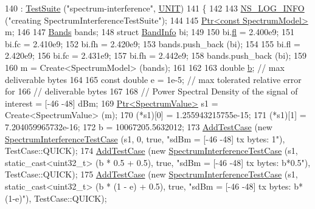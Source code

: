\begin{DoxyCode}
140   : \hyperlink{classns3_1_1TestSuite_a904b0c40583b744d30908aeb94636d1a}{TestSuite} (\textcolor{stringliteral}{"spectrum-interference"}, \hyperlink{classns3_1_1TestSuite_a1ebfcab34ec8161e085e8e3a1855eae0a3885375a3787abf60431f8454b3cadbd}{UNIT})
141 \{
142 
143   \hyperlink{group__logging_gafbd73ee2cf9f26b319f49086d8e860fb}{NS\_LOG\_INFO} (\textcolor{stringliteral}{"creating SpectrumInterferenceTestSuite"});
144 
145   \hyperlink{classns3_1_1Ptr}{Ptr<const SpectrumModel>} m;
146 
147   \hyperlink{namespacens3_a46ac9188e5cf43bd5292f7b67451246e}{Bands} bands;
148   \textcolor{keyword}{struct }\hyperlink{structns3_1_1BandInfo}{BandInfo} bi;
149 
150   bi.\hyperlink{structns3_1_1BandInfo_a5e9018ae65c7625cc6d5c3c0067a9104}{fl} = 2.400e9;
151   bi.fc = 2.410e9;
152   bi.fh = 2.420e9;
153   bands.push\_back (bi);
154 
155   bi.fl = 2.420e9;
156   bi.fc = 2.431e9;
157   bi.fh = 2.442e9;
158   bands.push\_back (bi);
159 
160   m = Create<SpectrumModel> (bands);
161 
162 
163   \textcolor{keywordtype}{double} \hyperlink{buildings__pathloss_8m_a21ad0bd836b90d08f4cf640b4c298e7c}{b}; \textcolor{comment}{// max deliverable bytes}
164 
165   \textcolor{keyword}{const} \textcolor{keywordtype}{double} e = 1e-5; \textcolor{comment}{// max tolerated relative error for}
166                          \textcolor{comment}{// deliverable bytes}
167 
168   \textcolor{comment}{// Power Spectral Density of the signal of interest  = [-46 -48] dBm;}
169   \hyperlink{classns3_1_1Ptr}{Ptr<SpectrumValue>} s1  = Create<SpectrumValue> (m);
170   (*s1)[0] = 1.255943215755e-15;
171   (*s1)[1] = 7.204059965732e-16;
172   b = 10067205.5632012;
173   \hyperlink{classns3_1_1TestCase_a3718088e3eefd5d6454569d2e0ddd835}{AddTestCase} (\textcolor{keyword}{new} \hyperlink{classSpectrumInterferenceTestCase}{SpectrumInterferenceTestCase} (s1,   0, \textcolor{keyword}{true},     
             \textcolor{stringliteral}{"sdBm  = [-46 -48]  tx bytes: 1"}), TestCase::QUICK);
174   \hyperlink{classns3_1_1TestCase_a3718088e3eefd5d6454569d2e0ddd835}{AddTestCase} (\textcolor{keyword}{new} \hyperlink{classSpectrumInterferenceTestCase}{SpectrumInterferenceTestCase} (s1, 
      static\_cast<uint32\_t> (b * 0.5 + 0.5), \textcolor{keyword}{true},   \textcolor{stringliteral}{"sdBm  = [-46 -48]  tx bytes: b*0.5"}), TestCase::QUICK);
175   \hyperlink{classns3_1_1TestCase_a3718088e3eefd5d6454569d2e0ddd835}{AddTestCase} (\textcolor{keyword}{new} \hyperlink{classSpectrumInterferenceTestCase}{SpectrumInterferenceTestCase} (s1, 
      static\_cast<uint32\_t> (b * (1 - e) + 0.5), \textcolor{keyword}{true}, \textcolor{stringliteral}{"sdBm  = [-46 -48]  tx bytes: b*(1-e)"}), TestCase::QUICK);

\end{DoxyCode}

